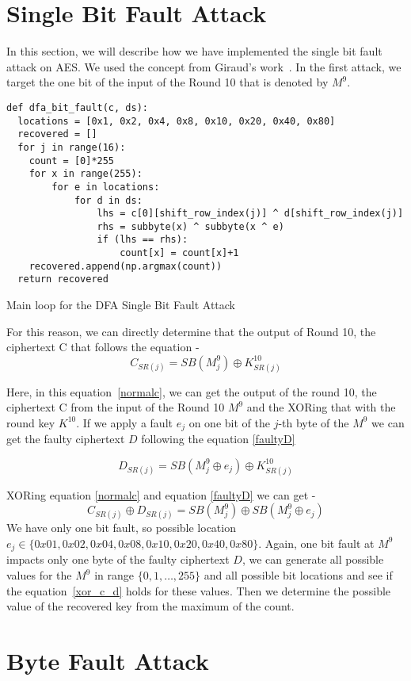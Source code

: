 \documentclass{article}
\begin{document}
\section{Single Bit Fault Attack}
In this section, we will describe how we have implemented the single bit fault attack on AES. We used the concept from Giraud's work~\cite{giraud2004dfa}. In the first attack, we target the one bit of the input of the Round 10 that is denoted by $M^9$.
\begin{listing}[H]
\begin{verbatim}
def dfa_bit_fault(c, ds):
  locations = [0x1, 0x2, 0x4, 0x8, 0x10, 0x20, 0x40, 0x80]
  recovered = []
  for j in range(16):
    count = [0]*255
    for x in range(255):
        for e in locations:
            for d in ds:
                lhs = c[0][shift_row_index(j)] ^ d[shift_row_index(j)]
                rhs = subbyte(x) ^ subbyte(x ^ e)
                if (lhs == rhs):
                    count[x] = count[x]+1
    recovered.append(np.argmax(count))
  return recovered    
\end{verbatim}
	\caption{Main loop for the DFA Single Bit Fault Attack}
	\label{single-bit-fault}
\end{listing}

For this reason, we can directly determine that the output of Round 10, the ciphertext C that follows the equation - 
\begin{equation}
C_{SR(j)} = SB(M^9_j) \oplus K^{10}_{SR(j)}
\label{normalc}
\end{equation}


Here, in this equation~\ref{normalc}, we can get the output of the round 10, the ciphertext C from the input of the Round 10 $M^9$ and the XORing that with the round key $K^{10}$. If we apply a fault $e_j$ on one bit of the $j$-th byte of the $M^9$ we can get the faulty ciphertext $D$ following the equation \ref{faultyD}

\begin{equation}
	D_{SR(j)} = SB(M^9_j \oplus e_j) \oplus K^{10}_{SR(j)}\label{faultyD}
\end{equation}

XORing equation \ref{normalc} and equation \ref{faultyD} we can get - 
\begin{equation}
C_{SR(j)}  \oplus	D_{SR(j)} = SB(M^9_j)   \oplus SB(M^9_j \oplus e_j)   \label{xor_c_d}
\end{equation}
We have only one bit fault, so possible location $e_j \in \{0x01, 0x02, 0x04,0x08,0x10,0x20,0x40,0x80\}$. Again, one bit fault at $M^9$ impacts only one byte of the faulty ciphertext $D$, we can generate all possible values for the $M^9$ in range $\{0,1,\ldots, 255\}$ and all possible bit locations and see if the equation~\ref{xor_c_d} holds for these values. Then we determine the possible value of the recovered key from the maximum of the count. 



\section{Byte Fault Attack}



\end{document}
